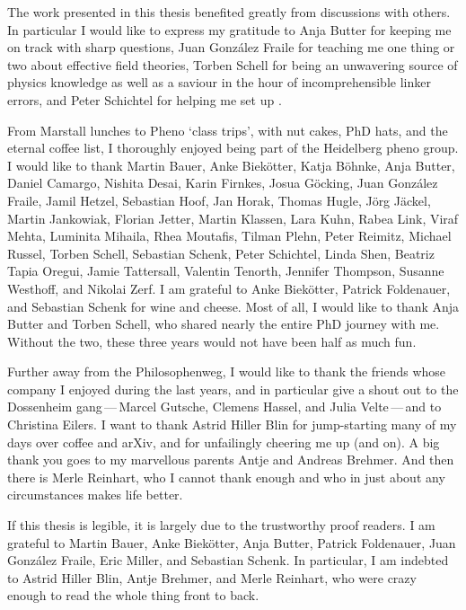 The work presented in this thesis benefited greatly from discussions
with others. In particular I would like to express my gratitude to
Anja Butter for keeping me on track with sharp questions, Juan
Gonz\'alez Fraile for teaching me one thing or two about effective
field theories, Torben Schell for being an unwavering source of physics
knowledge as well as a saviour in the hour of incomprehensible linker
errors, and Peter Schichtel for helping me set up
.

From Marstall lunches to Pheno `class trips', with nut cakes, PhD
hats, and the eternal coffee list,
%
I thoroughly enjoyed being part of the Heidelberg pheno group.
%
%
I would like to thank Martin Bauer, Anke Biek\"otter, Katja B\"ohnke,
Anja Butter, Daniel Camargo, Nishita Desai, Karin Firnkes, Josua
G\"ocking, Juan Gonz\'alez Fraile, Jamil Hetzel, Sebastian Hoof, Jan
Horak, Thomas Hugle, J\"org J\"ackel, Martin Jankowiak, Florian
Jetter, Martin Klassen, Lara Kuhn, Rabea Link, Viraf Mehta, Luminita
Mihaila, Rhea Moutafis, Tilman Plehn, Peter Reimitz, Michael Russel,
Torben Schell, Sebastian Schenk, Peter Schichtel, Linda Shen, Beatriz
Tapia Oregui, Jamie Tattersall, Valentin Tenorth, Jennifer Thompson,
Susanne Westhoff, and Nikolai Zerf. I am grateful to Anke Biek\"otter,
Patrick Foldenauer, and Sebastian Schenk for wine and cheese. Most of
all, I would like to thank Anja Butter and Torben Schell, who shared
nearly the entire PhD journey with me. Without the two, these three
years would not have been half as much fun.

Further away from the Philosophenweg, I would like to thank the
friends whose company I enjoyed during the last years, and in
particular give a shout out to the Dossenheim gang\,---\,Marcel
Gutsche, Clemens Hassel, and Julia Velte\,---\,and to Christina
Eilers. I want to thank Astrid Hiller Blin for jump-starting many of
my days over coffee and arXiv, and for unfailingly cheering me up (and
on). A big thank you goes to my marvellous parents Antje and Andreas
Brehmer. And then there is Merle Reinhart, who I cannot thank enough
and who in just about any circumstances makes life better.

If this thesis is legible, it is largely due to the trustworthy proof
readers. I am grateful to Martin Bauer, Anke Biek\"otter, Anja Butter,
Patrick Foldenauer, Juan Gonz\'alez Fraile, Eric Miller, and Sebastian
Schenk. In particular, I am indebted to Astrid Hiller Blin, Antje
Brehmer, and Merle Reinhart, who were crazy enough to read the whole
thing front to back.

